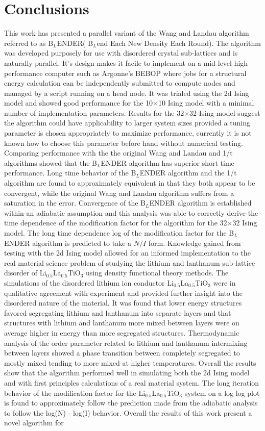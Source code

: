 \documentclass[aps,pre,reprint,superscriptaddress,showkeys]{revtex4-2}
\begin{document}
\section{Conclusions}
\label{sec5}
 This work has presented a parallel variant of the Wang and Landau algorithm referred to as B$_L$ENDER( B$_L$end Each New Density Each Round). The algorithm was developed purposely for use with disordered crystal sub-lattices and is naturally parallel. It's design makes it facile to implement on a mid level high performance computer such as Argonne's BEBOP where jobs for a structural energy calculation can be independently submitted to compute nodes  and managed by a script running on a head node. It was trialed using the 2d Ising model and showed good performance for the 10$\times$10 Ising model with a minimal number of implementation parameters. Results for the 32$\times$32 Ising model suggest the algorithm could have applicability to larger system sizes provided a tuning parameter is chosen appropriately to maximize performance, currently it is not known how to choose this parameter before hand without numerical testing. Comparing performance with the the original Wang and Landau and 1/t algorithms showed that the B$_L$ENDER algorithm has superior short time performance. Long time behavior of the B$_L$ENDER algorithm and the 1/t algorithm  are found to approximately equivalent in that they both appear to be convergent, while the original Wang and Landau algorithm suffers from a saturation in the error.  Convergence of the B$_L$ENDER algorithm is established within an adiabatic assumption and this analysis was able to correctly derive the time dependence of the modification factor for the algorithm for the 32$\times$32 Ising model. The long time dependence log of the modification factor for the B$_L$ENDER algorithm is predicted to take a $N/I$ form.  Knowledge gained from testing with the 2d Ising model allowed for an informed implementation to the real material science problem of studying the lithium and lanthanum sub-lattice disorder of Li$_{0.5}$La$_{0.5}$TiO$_{3}$ using density functional theory methods. The simulations of the disordered lithium ion conductor Li$_{0.5}$La$_{0.5}$TiO$_{3}$ were in qualitative agreement with experiment and provided further insight into the disordered nature of the material. It was found that lower energy structures favored segregating lithium and lanthanum into separate layers and that structures with lithium and lanthanum more mixed between layers were on average higher in energy than more segregated structures. Thermodynamic analysis of the order parameter related to lithium and lanthanum intermixing between layers showed a phase transition between completely segregated  to mostly mixed tending to more mixed at higher temperatures. Overall the results show that the algorithm performed well in simulating both the 2d Ising model and with first principles calculations of a real material system. The long iteration behavior of the modification factor for the Li$_{0.5}$La$_{0.5}$TiO$_{3}$ system on a log log plot is found to approximately follow  the prediction made from the adiabatic analysis to follow the log(N) - log(I) behavior. Overall the results of this work present a novel algorithm for 
\end{document}
